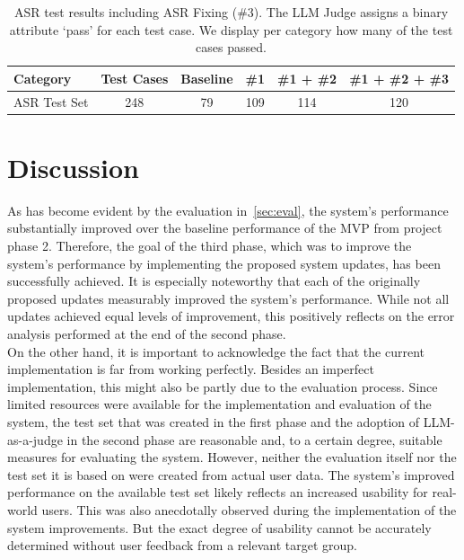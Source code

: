 \documentclass{article}
\begin{document}
\begin{table}[H]
\centering
\begin{tabular}{|l|c|c|c|c|c|}
\hline
\textbf{Category} & \textbf{Test Cases} & \textbf{Baseline} & \textbf{\#1} & \textbf{\#1 + \#2} & \textbf{\#1 + \#2 + \#3} \\
\hline
ASR Test Set & 248 & 79 & 109 & 114 & 120 \\
\hline
\end{tabular}
\caption{ASR test results including ASR Fixing (\#3). The LLM Judge assigns a binary attribute `pass' for each test case. We display per category how many of the test cases passed.}
\end{table}

\section{Discussion}
As has become evident by the evaluation in~\cref{sec:eval}, the system's performance substantially improved over the baseline performance of the MVP from project phase 2. Therefore, the goal of the third phase, which was to improve the system's performance by implementing the proposed system updates, has been successfully achieved. It is especially noteworthy that each of the originally proposed updates measurably improved the system's performance. While not all updates achieved equal levels of improvement, this positively reflects on the error analysis performed at the end of the second phase.\\

On the other hand, it is important to acknowledge the fact that the current implementation is far from working perfectly. Besides an imperfect implementation, this might also be partly due to the evaluation process. Since limited resources were available for the implementation and evaluation of the system, the test set that was created in the first phase and the adoption of LLM-as-a-judge in the second phase are reasonable and, to a certain degree, suitable measures for evaluating the system. However, neither the evaluation itself nor the test set it is based on were created from actual user data. The system's improved performance on the available test set likely reflects an increased usability for real-world users. This was also anecdotally observed during the implementation of the system improvements. But the exact degree of usability cannot be accurately determined without user feedback from a relevant target group.\\
\end{document}

